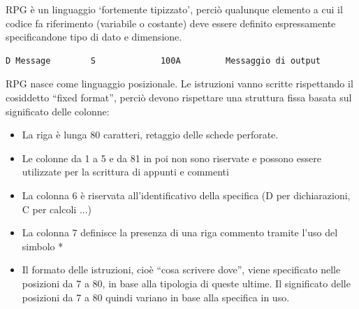 \documentclass[target=bach,aauheader=,style=]{thud}
\begin{document}
RPG è un linguaggio ‘fortemente tipizzato’, perciò qualunque
elemento a cui il codice fa riferimento (variabile o costante)
deve essere definito espressamente specificandone tipo di
dato e dimensione.
\begin{lstlisting}[language=RPG, caption=Dichiarazione di una variabile alfanumerica di lunghezza 100, label=lst:rpgdeclaration]
    D Message        S             100A         Messaggio di output
\end{lstlisting}


RPG nasce come linguaggio posizionale. Le istruzioni vanno scritte rispettando il cosiddetto “fixed format”, perciò devono rispettare una struttura fissa basata sul significato delle colonne:
\begin{itemize}
    \setlength{\itemsep}{0pt} %
    \item La riga è lunga 80 caratteri, retaggio delle schede perforate.
    \item Le colonne da 1 a 5 e da 81 in poi non sono riservate e possono essere utilizzate per la scrittura di appunti e commenti
    \item La colonna 6 è riservata all’identificativo della specifica (D per dichiarazioni, C per calcoli ...)
    \item La colonna 7 definisce la presenza di una riga commento tramite l'uso del simbolo *
    \item Il formato delle istruzioni, cioè “cosa scrivere dove”, viene specificato nelle posizioni da 7 a 80,  in base alla tipologia di queste ultime. Il significato delle posizioni da 7 a 80 quindi variano in base alla specifica in uso.
\end{itemize}
\end{document}
